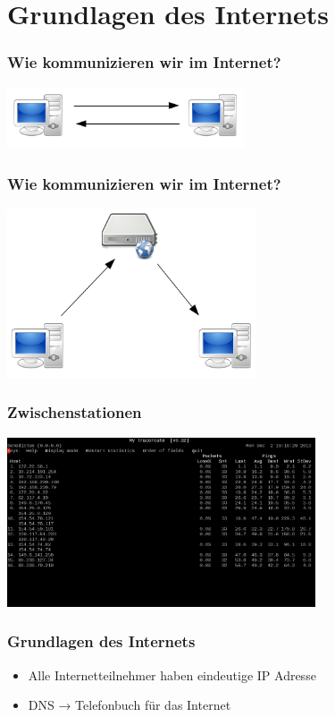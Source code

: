 \documentclass[12pt]{beamer}
\begin{document}
\section{Grundlagen des Internets}

\begin{frame}
    \frametitle{Wie kommunizieren wir im Internet?}
    \begin{center}
      \includegraphics[width=7cm]{img/direkt.png}
    \end{center}
\end{frame}

\begin{frame}
    \frametitle{Wie kommunizieren wir im Internet?}
    \begin{center}
      \includegraphics[height=5cm]{img/c-s.png}
    \end{center}
\end{frame}

\begin{frame}
    \frametitle{Zwischenstationen}
    \begin{center}
      \includegraphics[height=5cm]{img/mtr.png}
    \end{center}
\end{frame}

\begin{frame}
	\frametitle{Grundlagen des Internets}
	\begin{center}
		\begin{itemize}
			\item<1-> Alle Internetteilnehmer haben eindeutige IP Adresse
			\item<2-> DNS → Telefonbuch für das Internet
		\end{itemize}
	\end{center}
\end{frame}
\end{document}
